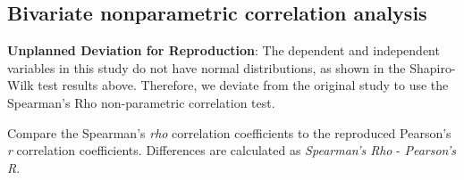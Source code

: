 \documentclass[
]{article}
\begin{document}
\hypertarget{bivariate-nonparametric-correlation-analysis}{%
\subsection{Bivariate nonparametric correlation
analysis}\label{bivariate-nonparametric-correlation-analysis}}

\textbf{Unplanned Deviation for Reproduction}: The dependent and
independent variables in this study do not have normal distributions, as
shown in the Shapiro-Wilk test results above. Therefore, we deviate from
the original study to use the Spearman's Rho non-parametric correlation
test.

Compare the Spearman's \emph{rho} correlation coefficients to the
reproduced Pearson's \emph{r} correlation coefficients. Differences are
calculated as \emph{Spearman's Rho} - \emph{Pearson's R}.
\end{document}
